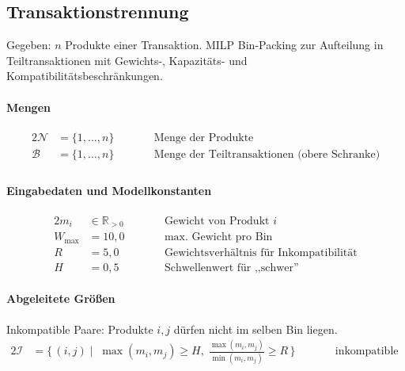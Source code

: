 \documentclass[10pt]{article}
\newcommand{\NN}{\mathcal{N}}
\newcommand{\BB}{\mathcal{B}}
\begin{document}
\subsection{Transaktionstrennung}
\label{sec:s0}

Gegeben: $n$ Produkte einer Transaktion.
MILP Bin-Packing zur Aufteilung in Teiltransaktionen mit Gewichts-,
Kapazit\"ats- und Kompatibilit\"atsbeschr\"ankungen.

\paragraph{Mengen}

\begin{alignat*}{2}
\NN &= \{1, \dots, n\}
  &\qquad& \text{Menge der Produkte} \\
\BB &= \{1, \dots, n\}
  && \text{Menge der Teiltransaktionen (obere Schranke)} \\
\end{alignat*}

\paragraph{Eingabedaten und Modellkonstanten}

\begin{alignat*}{2}
m_i &\in \mathbb{R}_{>0}
  &\qquad& \text{Gewicht von Produkt $i$} \\
W_{\max} &= 10{,}0
  && \text{max.\ Gewicht pro Bin} \\
R &= 5{,}0
  && \text{Gewichtsverh\"altnis f\"ur Inkompatibilit\"at} \\
H &= 0{,}5
  && \text{Schwellenwert f\"ur ,,schwer''}
\end{alignat*}

\paragraph{Abgeleitete Gr\"o\ss en}

Inkompatible Paare: Produkte $i, j$ d\"urfen nicht im selben Bin liegen.
\begin{alignat*}{2}
\mathcal{I} &= \bigl\{\, (i,j) \mid \;
  \max(m_i, m_j) \geq H,\;
  \tfrac{\max(m_i, m_j)}{\min(m_i, m_j)} \geq R
  \,\bigr\}
  &\qquad& \text{inkompatible Paare} \\
\end{alignat*}
\end{document}
